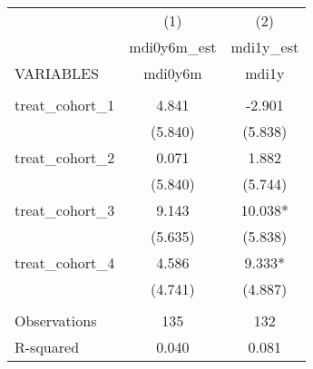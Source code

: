 \documentclass[]{article}
\begin{document}
\begin{tabular}{lcc} \hline
 & (1) & (2) \\
 & mdi0y6m\_est & mdi1y\_est \\
VARIABLES & mdi0y6m & mdi1y \\ \hline
 &  &  \\
treat\_cohort\_1 & 4.841 & -2.901 \\
 & (5.840) & (5.838) \\
treat\_cohort\_2 & 0.071 & 1.882 \\
 & (5.840) & (5.744) \\
treat\_cohort\_3 & 9.143 & 10.038* \\
 & (5.635) & (5.838) \\
treat\_cohort\_4 & 4.586 & 9.333* \\
 & (4.741) & (4.887) \\
 &  &  \\
Observations & 135 & 132 \\
 R-squared & 0.040 & 0.081 \\ \hline
\end{tabular}
\end{document}
